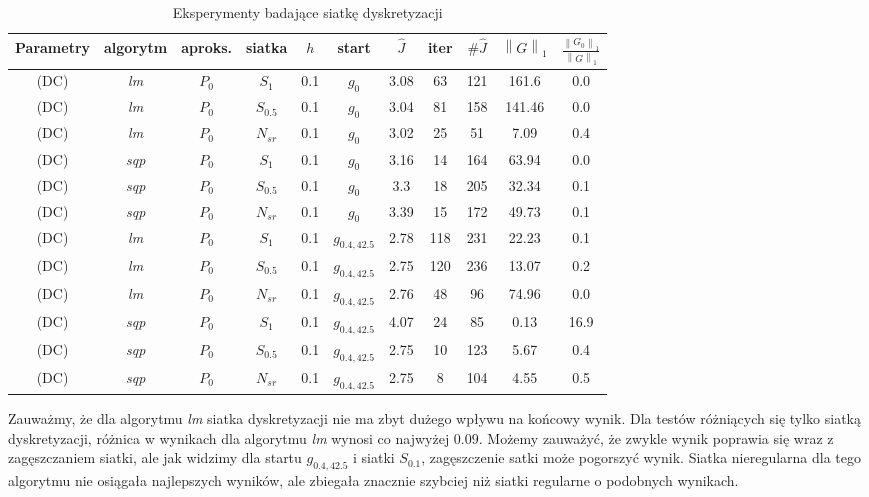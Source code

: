 \documentclass[11pt]{article}
\newcommand{\norm}[1]{\left\lVert#1\right\rVert}
\begin{document}
\begin{table}[h!]
  \begin{center}
    \begin{tabular}{|c|c|c|c|c|c|c|c|c|c|c|}
      \hline
      Parametry & algorytm & aproks. & siatka & $h$ & start & $\hat{J}$ & iter & $\#\hat{J}$ & $\norm{G}_1$ & $\frac{\norm{G_0}_1}{\norm{G}_1}$ \\
      \hline
      (DC) & {\it lm\/} & $P_0$ & $S_1$ & 0.1 & $g_0$ & 3.08 & 63 & 121 & 161.6 & 0.0 \\
      \hline
      (DC) & {\it lm\/} & $P_0$ & $S_{0.5}$ & 0.1 & $g_0$ & 3.04 & 81 & 158 & 141.46 & 0.0 \\
      \hline
      (DC) & {\it lm\/} & $P_0$ & $N_{sr}$ & 0.1 & $g_0$ & 3.02 & 25 & 51 & 7.09 & 0.4 \\
      \hline
      (DC) & {\it sqp\/} & $P_0$ & $S_1$ & 0.1 & $g_0$ & 3.16 & 14 & 164 & 63.94 & 0.0 \\
      \hline
      (DC) & {\it sqp\/} & $P_0$ & $S_{0.5}$ & 0.1 & $g_0$ & 3.3 & 18 & 205 & 32.34 & 0.1 \\
      \hline
      (DC) & {\it sqp\/} & $P_0$ & $N_{sr}$ & 0.1 & $g_0$ & 3.39 & 15 & 172 & 49.73 & 0.1 \\
      \hline
      (DC) & {\it lm\/} & $P_0$ & $S_1$ & 0.1 & $g_{0.4,42.5}$ & 2.78 & 118 & 231 & 22.23 & 0.1 \\
      \hline
      (DC) & {\it lm\/} & $P_0$ & $S_{0.5}$ & 0.1 & $g_{0.4,42.5}$ & 2.75 & 120 & 236 & 13.07 & 0.2 \\
      \hline
      (DC) & {\it lm\/} & $P_0$ & $N_{sr}$ & 0.1 & $g_{0.4,42.5}$ & 2.76 & 48 & 96 & 74.96 & 0.0 \\
      \hline
      (DC) & {\it sqp\/} & $P_0$ & $S_1$ & 0.1 & $g_{0.4,42.5}$ & 4.07 & 24 & 85 & 0.13 & 16.9 \\
      \hline
      (DC) & {\it sqp\/} & $P_0$ & $S_{0.5}$ & 0.1 & $g_{0.4,42.5}$ & 2.75 & 10 & 123 & 5.67 & 0.4 \\
      \hline
      (DC) & {\it sqp\/} & $P_0$ & $N_{sr}$ & 0.1 & $g_{0.4,42.5}$ & 2.75 & 8 & 104 & 4.55 & 0.5 \\
      \hline
    \end{tabular}
    \caption{Eksperymenty badające siatkę dyskretyzacji}\label{grid_tbl}
  \end{center}
\end{table}

Zauważmy, że dla algorytmu {\it lm\/} siatka dyskretyzacji nie ma zbyt dużego wpływu na końcowy wynik. Dla testów różniących się tylko siatką dyskretyzacji, różnica w wynikach dla algorytmu {\it lm\/} wynosi co najwyżej $0.09$. Możemy zauważyć, że zwykle wynik poprawia się wraz z zagęszczaniem siatki, ale jak widzimy dla startu $g_{0.4,42.5}$ i siatki $S_{0.1}$, zagęszczenie satki może pogorszyć wynik. Siatka nieregularna dla tego algorytmu nie osiągała najlepszych wyników, ale zbiegała znacznie szybciej niż siatki regularne o podobnych wynikach.
\end{document}
